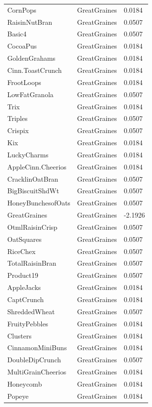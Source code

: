 \begin{table}[!htbp]
\begin{tabular}{lll}
\\
CornPops & GreatGraines & 0.0184
\\
RaisinNutBran & GreatGraines & 0.0507
\\
Basic4 & GreatGraines & 0.0507
\\
CocoaPus & GreatGraines & 0.0184
\\
GoldenGrahams & GreatGraines & 0.0184
\\
Cinn.ToastCrunch & GreatGraines & 0.0184
\\
FrootLoops & GreatGraines & 0.0184
\\
LowFatGranola & GreatGraines & 0.0507
\\
Trix & GreatGraines & 0.0184
\\
Triples & GreatGraines & 0.0507
\\
Crispix & GreatGraines & 0.0507
\\
Kix & GreatGraines & 0.0184
\\
LuckyCharms & GreatGraines & 0.0184
\\
AppleCinn.Cheerios & GreatGraines & 0.0184
\\
CracklinOatBran & GreatGraines & 0.0507
\\
BigBiscuitShdWt & GreatGraines & 0.0507
\\
HoneyBunchesofOats & GreatGraines & 0.0507
\\
GreatGraines & GreatGraines & -2.1926
\\
OtmlRaisinCrisp & GreatGraines & 0.0507
\\
OatSquares & GreatGraines & 0.0507
\\
RiceChex & GreatGraines & 0.0507
\\
TotalRaisinBran & GreatGraines & 0.0507
\\
Product19 & GreatGraines & 0.0507
\\
AppleJacks & GreatGraines & 0.0184
\\
CaptCrunch & GreatGraines & 0.0184
\\
ShreddedWheat & GreatGraines & 0.0507
\\
FruityPebbles & GreatGraines & 0.0184
\\
Clusters & GreatGraines & 0.0184
\\
CinnamonMiniBuns & GreatGraines & 0.0184
\\
DoubleDipCrunch & GreatGraines & 0.0507
\\
MultiGrainCheerios & GreatGraines & 0.0184
\\
Honeycomb & GreatGraines & 0.0184
\\
Popeye & GreatGraines & 0.0184

\end{tabular}
\end{table}
